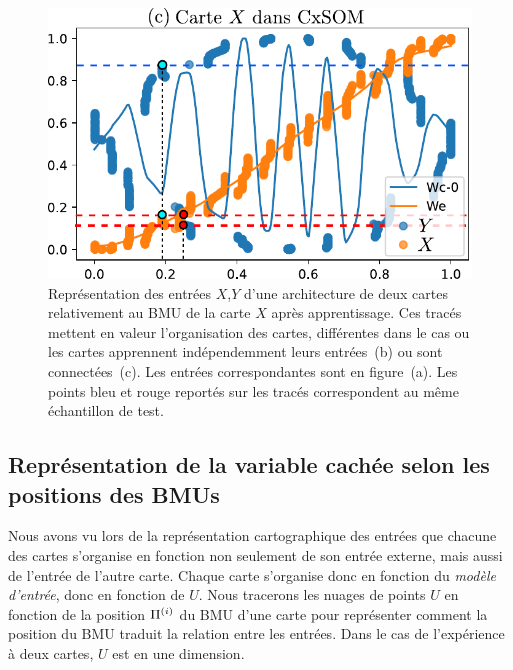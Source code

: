 \begin{figure}
\begin{minipage}{0.38\textwidth}
\includegraphics[width=\textwidth]{weights_2som.pdf}
\end{minipage}

\caption{Représentation des entrées $X$,$Y$ d'une architecture de deux cartes relativement au BMU de la carte $X$ après apprentissage. Ces tracés mettent en valeur l'organisation des cartes, différentes dans le cas ou les cartes apprennent indépendemment leurs entrées~(b) ou sont connectées~(c). Les entrées correspondantes sont en figure~(a). Les points bleu et rouge reportés sur les tracés correspondent au même échantillon de test.\label{fig:inputs}}
\end{figure}

\subsection{Représentation de la variable cachée selon les positions des BMUs}

Nous avons vu lors de la représentation cartographique des entrées que chacune des cartes s'organise en fonction non seulement de son entrée externe, mais aussi de l'entrée de l'autre carte. Chaque carte s'organise donc en fonction du \emph{modèle d'entrée}, donc en fonction de $U$.
Nous tracerons les nuages de points $U$ en fonction de la position $\Pi^{({i})}$ du BMU d'une carte pour représenter comment la position du BMU traduit la relation entre les entrées. Dans le cas de l'expérience à deux cartes, $U$ est en une dimension.

